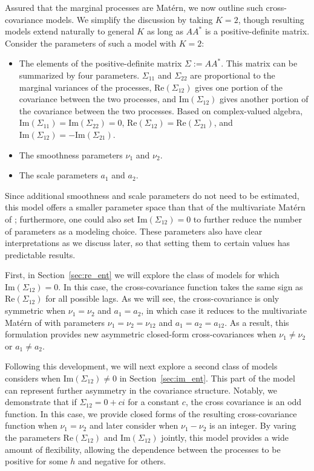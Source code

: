 \documentclass[11pt]{article}
\begin{document}
Assured that the marginal processes are Mat\'ern, we now outline such cross-covariance models. We simplify the discussion by taking $K=2$, though resulting models extend naturally to general $K$ as long as $AA^*$ is a positive-definite matrix. Consider the parameters of such a model with $K=2$: \begin{itemize}
\item The elements of the positive-definite matrix $\Sigma := AA^*$. This matrix can be summarized by four parameters. $\Sigma_{11}$ and $\Sigma_{22}$ are proportional to the marginal variances of the processes, $\textrm{Re}(\Sigma_{12})$ gives one portion of the covariance between the two processes, and $\textrm{Im}(\Sigma_{12})$ gives another portion of the covariance between the two processes. Based on complex-valued algebra, $\textrm{Im}(\Sigma_{11}) = \textrm{Im}(\Sigma_{22}) = 0$, $\textrm{Re}(\Sigma_{12}) = \textrm{Re}(\Sigma_{21})$, and $\textrm{Im}(\Sigma_{12}) = -\textrm{Im}(\Sigma_{21})$.
\item The smoothness parameters $\nu_1$ and $\nu_2$.
\item The scale parameters $a_1$ and $a_2$.
\end{itemize}Since additional smoothness and scale parameters do not need to be estimated, this model offers a smaller parameter space than that of the multivariate Mat\'ern of \cite{gneiting_matern_2010}; furthermore, one could also set $\textrm{Im}(\Sigma_{12})=0$ to further reduce the number of parameters as a modeling choice. These parameters also have clear interpretations as we discuss later, so that setting them to certain values has predictable results.  

First, in Section~\ref{sec:re_ent} we will explore the class of models for which $\textrm{Im}(\Sigma_{12}) = 0$. In this case, the cross-covariance function takes the same sign as $\textrm{Re}(\Sigma_{12})$ for all possible lags. As we will see, the cross-covariance is only symmetric when $\nu_1 = \nu_2$ and $a_1 = a_2$, in which case it reduces to the multivariate Mat\'ern of \cite{gneiting_matern_2010} with parameters $\nu_1 = \nu_2 = \nu_{12}$ and $a_1 = a_2 = a_{12}$. As a result, this formulation provides new asymmetric closed-form cross-covariances when $\nu_1 \neq \nu_2$ or $a_1 \neq a_2$.

Following this development, we will next explore a second class of models considers when $\textrm{Im}(\Sigma_{12}) \neq 0$ in Section~\ref{sec:im_ent}. This part of the model can represent further asymmetry in the covariance structure. Notably, we demonstrate that if $\Sigma_{12} = 0 + ci$ for a constant $c$, the cross covariance is an odd function. In this case, we provide closed forms of the resulting cross-covariance function when $\nu_1 = \nu_2$ and later consider when $\nu_1 - \nu_2$ is an integer. By varing the parameters $\textrm{Re}(\Sigma_{12})$ and $\textrm{Im}(\Sigma_{12})$ jointly, this model provides a wide amount of flexibility, allowing the dependence between the processes to be positive for some $h$ and negative for others. 
\end{document}
